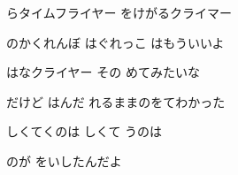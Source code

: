 \documentclass[14pt]{ltjsarticle}
\begin{document}
{\item
  らタイムフライヤー をけがるクライマー
  \jisho{}

  のかくれんぼ はぐれっこ はもういいよ
  \jisho{}

\item
  はなクライヤー その めてみたいな
  \jisho{}

  
だけど はんだ れるままのをてわかった
  \jisho{}

\item
  しくてくのは しくて うのは
  \jisho{}

  のが をいしたんだよ
  \jisho{}

  
}
\end{document}
